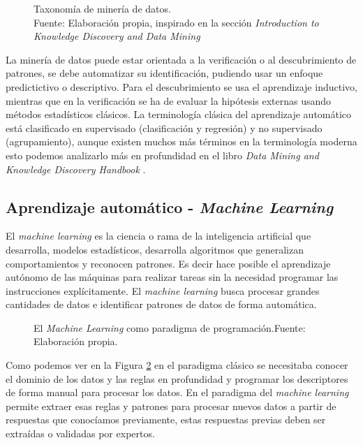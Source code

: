 \begin{figure}[H]
  \centering
  \centerline{}
  \caption{Taxonomía de minería de datos.\\Fuente: Elaboración propia, inspirado en la sección \textit{Introduction to Knowledge Discovery and Data Mining} \cite{maimon2005data}}
  \label{fig:data-mining-taxonomy}
\end{figure}

La minería de datos puede estar orientada a la verificación o al descubrimiento de patrones, se debe automatizar su identificación, pudiendo usar un enfoque predictictivo o descriptivo. Para el descubrimiento se usa el aprendizaje inductivo, mientras que en la verificación se ha de evaluar la hipótesis externas usando métodos estadísticos clásicos. La terminología clásica del aprendizaje automático está clasificado en supervisado (clasificación y regresión) y no supervisado (agrupamiento), aunque existen muchos más términos en la terminología moderna esto podemos analizarlo más en profundidad en el libro \textit{Data Mining and Knowledge Discovery Handbook} \cite{maimon2005data}.


\subsection{Aprendizaje automático - \textit{Machine Learning}}

El \textit{machine learning} es la ciencia o rama de la inteligencia artificial que desarrolla, modelos estadísticos, desarrolla algoritmos que generalizan comportamientos y reconocen patrones. Es decir hace posible el aprendizaje autónomo de las máquinas para realizar tareas sin la necesidad programar las instrucciones explícitamente. El \textit{machine learning} busca procesar grandes cantidades de datos e identificar patrones de datos de forma automática.

\begin{figure}[H]
  \centering
  \centerline{}
  \caption{El \textit{Machine Learning} como paradigma de programación.\newline{}Fuente: Elaboración propia.}
  \label{fig:machine-learning-rules}
\end{figure}

Como podemos ver en la Figura \ref{fig:machine-learning-rules} en el paradigma clásico se necesitaba conocer el dominio de los datos y las reglas en profundidad y programar los descriptores de forma manual para procesar los datos. En el paradigma del \textit{machine learning} permite extraer esas reglas y patrones para procesar nuevos datos a partir de respuestas que conocíamos previamente, estas respuestas previas deben ser extraídas o validadas por expertos.

